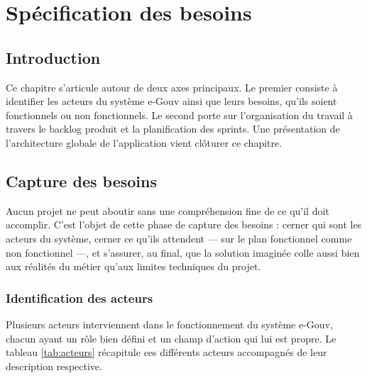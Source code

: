 
\chapter{Spécification des besoins}

\section{Introduction}

Ce chapitre s'articule autour de deux axes principaux. Le premier consiste à identifier les acteurs du système e-Gouv ainsi que leurs besoins, qu'ils soient fonctionnels ou non fonctionnels. Le second porte sur l'organisation du travail à travers le backlog produit et la planification des sprints. Une présentation de l'architecture globale de l'application vient clôturer ce chapitre.


\section{Capture des besoins}

Aucun projet ne peut aboutir sans une compréhension fine de ce qu'il doit accomplir. C'est l'objet de cette phase de capture des besoins : cerner qui sont les acteurs du système, cerner ce qu'ils attendent — sur le plan fonctionnel comme non fonctionnel —, et s'assurer, au final, que la solution imaginée colle aussi bien aux réalités du métier qu'aux limites techniques du projet. 


\subsection{Identification des acteurs}

Plusieurs acteurs interviennent dans le fonctionnement du système e-Gouv, chacun ayant un rôle bien défini et un champ d'action qui lui est propre. Le tableau \ref{tab:acteurs} récapitule ces différents acteurs accompagnés de leur description respective. 


